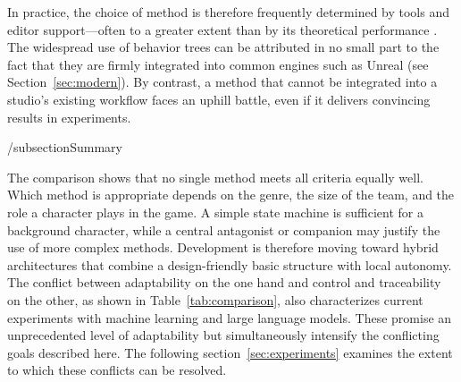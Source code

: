In practice, the choice of method is therefore frequently determined by tools and editor support—often to a greater extent than by its theoretical performance \cite{rabin2013}. The widespread use of behavior trees can be attributed in no small part to the fact that they are firmly integrated into common engines such as Unreal (see Section~\ref{sec:modern}). By contrast, a method that cannot be integrated into a studio’s existing workflow faces an uphill battle, even if it delivers convincing results in experiments.

/subsection{Summary}

The comparison shows that no single method meets all criteria equally well. Which method is appropriate depends on the genre, the size of the team, and the role a character plays in the game. A simple state machine is sufficient for a background character, while a central antagonist or companion may justify the use of more complex methods. Development is therefore moving toward hybrid architectures that combine a design-friendly basic structure with local autonomy. The conflict between adaptability on the one hand and control and traceability on the other, as shown in Table~\ref{tab:comparison}, also characterizes current experiments with machine learning and large language models. These promise an unprecedented level of adaptability but simultaneously intensify the conflicting goals described here. The following section~\ref{sec:experiments} examines the extent to which these conflicts can be resolved.

